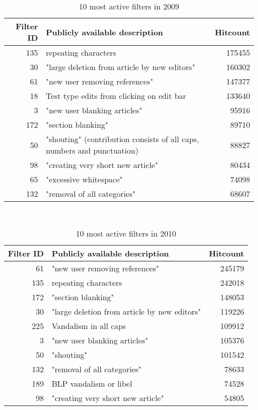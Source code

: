 \begin{table}
  \centering
  \begin{tabular}{r p{9cm} r }
    Filter ID & Publicly available description & Hitcount \\ %
    \hline
    135 & repeating characters & 175455 \\
    30 & "large deletion from article by new editors" & 160302 \\
    61 & "new user removing references" & 147377 \\
    18 & Test type edits from clicking on edit bar & 133640 \\
    3 & "new user blanking articles" & 95916 \\
    172 & "section blanking" & 89710 \\
    50 & "shouting" (contribution consists of all caps, numbers and punctuation) & 88827 \\
    98 & "creating very short new article" & 80434 \\
    65 & "excessive whitespace"  & 74098 \\
    132 & "removal of all categories" & 68607 \\
  \end{tabular}
  \caption{10 most active filters in 2009}~\label{tab:app-most-active-2009}
\end{table}

\begin{table}
  \centering
  \begin{tabular}{r p{9cm} r }
    Filter ID & Publicly available description & Hitcount \\
    \hline
    61 & "new user removing references"  & 245179 \\
    135 & repeating characters & 242018 \\
    172 & "section blanking" & 148053 \\
    30 & "large deletion from article by new editors" & 119226 \\
    225 & Vandalism in all caps & 109912 \\
    3 & "new user blanking articles" & 105376 \\
    50 & "shouting"  & 101542 \\
    132 & "removal of all categories" & 78633 \\
    189 & BLP vandalism or libel & 74528 \\
    98 & "creating very short new article" & 54805 \\
  \end{tabular}
  \caption{10 most active filters in 2010}~\label{tab:app-most-active-2010}
\end{table}

